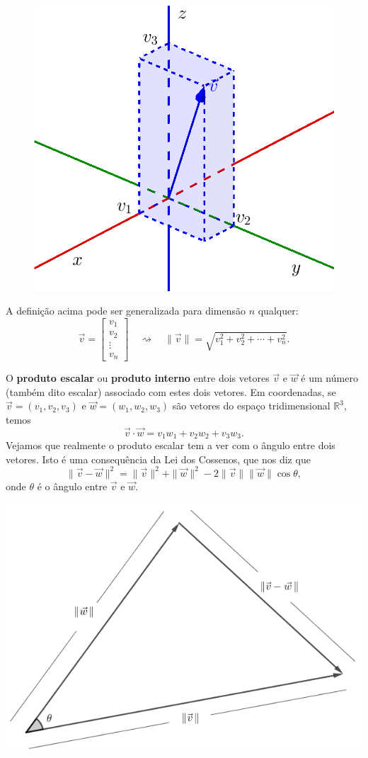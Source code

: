 \begin{figure}[h!]
	\begin{center}
		\includegraphics[width=0.3\linewidth]{Semana11/semana11-coord}
	\end{center}
\end{figure}

\noindent A definição acima pode ser generalizada para dimensão $n$ qualquer:
\begin{equation}
\vec{v} =
\begin{bmatrix}
v_1 \\ v_2 \\ \vdots \\ v_n
\end{bmatrix} \quad \rightsquigarrow \quad \|\vec{v}\| = \sqrt{v_1^2 + v_2^2 + \cdots + v_n^2}.
\end{equation}


O \textbf{produto escalar} ou \textbf{produto interno} entre dois vetores $\vec{v}$ e $\vec{w}$ é um número (também dito escalar) associado com estes dois vetores. Em coordenadas, se $\vec{v} = (v_1, v_2, v_3)$ e $\vec{w} = (w_1, w_2, w_3)$ são vetores do espaço tridimensional $\mathbb{R}^3$, temos
\begin{equation}
\vec{v} \cdot \vec{w} = v_1 w_1 + v_2 w_2 + v_3 w_3.
\end{equation} Vejamos que realmente o produto escalar tem a ver com o ângulo entre dois vetores. Isto é uma consequência da Lei dos Cossenos, que nos diz que
\begin{equation}
\|\vec{v} - \vec{w}\|^2 = \|\vec{v}\|^2 + \|\vec{w}\|^2 - 2 \|\vec{v}\| \|\vec{w}\| \cos \theta,
\end{equation} onde $\theta$ é o ângulo entre $\vec{v}$ e $\vec{w}$.

	\begin{center}
		\includegraphics[width=0.7\linewidth]{Semana11/semana11-cossenos}
	\end{center}

